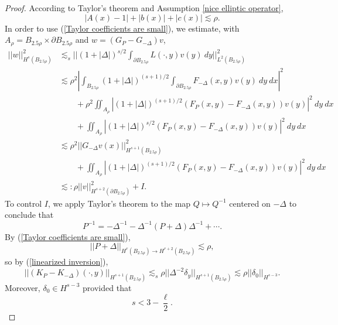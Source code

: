 \documentclass[reqno,12pt,letterpaper]{amsart}
\theoremstyle{definition}
\numberwithin{equation}{section}
\begin{document}
\begin{proof}
According to Taylor's theorem and Assumption \ref{nice elliptic operator},
\begin{equation}\label{Taylor coefficients are small}
|A(x) - 1| + |b(x)| + |c(x)| \lesssim \rho.
\end{equation}
In order to use (\ref{Taylor coefficients are small}), we estimate, with $A_\rho = B_{2.5\rho} \times \partial B_{2.5\rho}$ and $w = (G_P - G_{-\Delta})v$,
\begin{align*}
||w||_{H^s(B_{2.5\rho})}^2 &\lesssim_s ||(1 + |\Delta|)^{s/2} \int_{\partial B_{2.5\rho}} L(\cdot, y) v(y) ~dy||_{L^2(B_{2.5\rho})}^2\\
&\lesssim \rho^2 \left|\int_{B_{2.5\rho}} (1 + |\Delta|)^{(s+1)/2} \int_{\partial B_{2.5\rho}} F_{-\Delta}(x, y) v(y) ~dy ~dx\right|^2 \\
&\qquad + \rho^2 \iint_{A_\rho} |(1 + |\Delta|)^{(s+1)/2} (F_P(x, y) - F_{-\Delta}(x, y)) v(y)|^2 ~dy ~dx \\
&\qquad + \iint_{A_\rho} |(1 + |\Delta|)^{s/2} (F_P(x, y) - F_{-\Delta}(x, y)) v(y)|^2 ~dy ~dx \\
&\lesssim \rho^2 ||G_{-\Delta}v(x)||_{H^{s+1}(B_{2.5\rho})}^2\\
&\qquad + \iint_{A_\rho} |(1 + |\Delta|)^{(s+1)/2} (F_P(x, y) - F_{-\Delta}(x, y)) v(y)|^2 ~dy ~dx\\
&\lesssim: \rho ||v||_{H^{s + 2}(\partial B_{2.5\rho})}^2 + I.
\end{align*}
To control $I$, we apply Taylor's theorem to the map $Q \mapsto Q^{-1}$ centered on $-\Delta$ to conclude that
\begin{equation}\label{linearized inversion}
P^{-1} = -\Delta^{-1} - \Delta^{-1}(P + \Delta)\Delta^{-1} + \cdots.
\end{equation}
By (\ref{Taylor coefficients are small}),
$$||P + \Delta||_{H^r(B_{2.5\rho}) \to H^{r+2}(B_{2.5\rho})} \lesssim \rho,$$
so by (\ref{linearized inversion}),
$$||(K_P - K_{-\Delta})(\cdot, y)||_{H^{s + 1}(B_{2.5\rho})} \lesssim_s \rho ||\Delta^{-2} \delta_y||_{H^{s + 1}(B_{2.5\rho})} \lesssim \rho ||\delta_0||_{H^{s-3}}.$$
Moreover, $\delta_0 \in H^{s - 3}$ provided that
\begin{equation}\label{delta regularity}
s < 3 - \frac{\ell}{2}.
\end{equation}


\end{proof}
\end{document}
